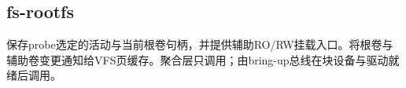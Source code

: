 
\subsection{fs-rootfs}

保存probe选定的活动与当前根卷句柄，并提供辅助RO/RW挂载入口。将根卷与辅助卷变更通知给VFS页缓存。聚合层只调用；由bring-up总线在块设备与驱动就绪后调用。




